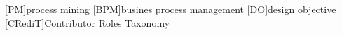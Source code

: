 \begin{acronym}
  [PM]{process mining}
  [BPM]{busines process management}
  [DO]{design objective}
  [CRediT]{Contributor Roles Taxonomy}

\end{acronym}
  